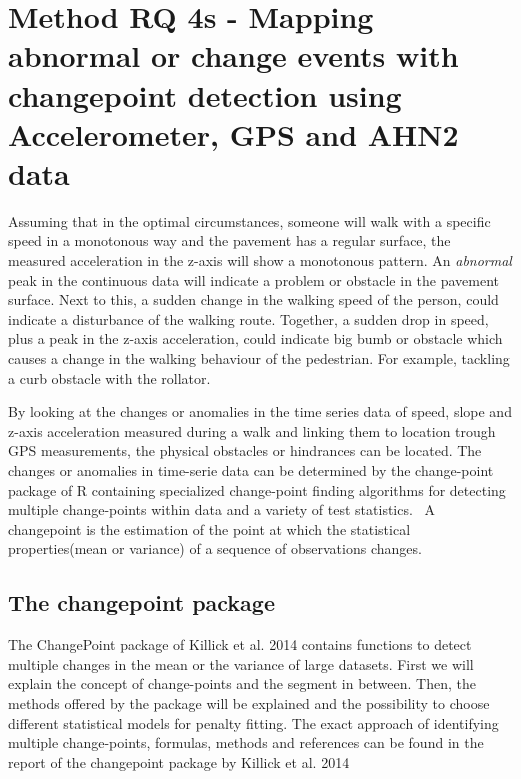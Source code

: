 \section{Method RQ 4s - Mapping abnormal or change events with changepoint detection using Accelerometer, GPS and AHN2 data}\label{rq2c}

Assuming that in the optimal circumstances, someone will walk with a specific speed in a monotonous way and the pavement has a regular surface, the measured acceleration in the z-axis will show a monotonous pattern. An \emph{abnormal} peak in the continuous data will indicate a problem or obstacle in the pavement surface. Next to this, a sudden change in the walking speed of the person, could indicate a disturbance of the walking route. Together, a sudden drop in speed, plus a peak in the z-axis acceleration, could indicate big bumb or obstacle which causes a change in the walking behaviour of the pedestrian. For example, tackling a curb obstacle with the rollator. 

By looking at the changes or anomalies in the time series data of speed, slope and z-axis acceleration measured during a walk and linking them to location trough GPS measurements, the physical obstacles or hindrances can be located. The changes or anomalies in time-serie data can be determined by the change-point package of R containing specialized change-point finding algorithms for detecting multiple change-points within data and a variety of test statistics.~\cite{changepoint2015, killick2014} A changepoint is the estimation of the point at which the statistical properties(mean or variance) of a sequence of observations changes.

\subsection{The changepoint package}
The ChangePoint package of Killick et al. 2014 contains functions to detect multiple changes in the mean or the variance of large datasets. First we will explain the concept of change-points and the segment in between. Then, the methods offered by the package will be explained and the possibility to choose different statistical models for penalty fitting. The exact approach of identifying multiple change-points, formulas, methods and references can be found in the report of the changepoint package by Killick et al. 2014~\cite{killick2014}


